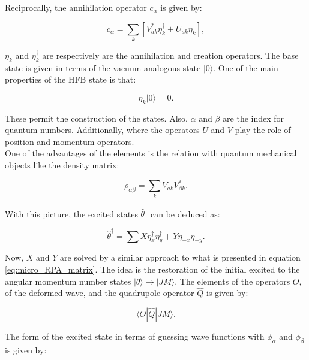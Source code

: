 \documentclass[openany]{book}
\begin{document}
Reciprocally, the annihilation operator $c_\alpha$ is given by: 


\begin{equation}\label{eq:micro_HFB_annihilation}
	c_\alpha = \sum_{k} [V^{*}_{ak} \eta^{\dagger}_k + U_{ak} \eta_k],
\end{equation}

$\eta_k$ and  $\eta^{\dagger}_k $ are respectively are the annihilation and creation operators.  The base state is given in terms of the vacuum analogous state $| 0 \rangle$. One of the main properties of the HFB state is that: 

\begin{equation}\label{eq:micro_HFB_base}
	\eta_k |0\rangle = 0.
\end{equation} 

These permit the construction of the states. Also, $\alpha$ and $\beta$ are the index for quantum numbers. Additionally, where the operators $U$ and $V$ play the role of position and momentum operators. \\

One of the advantages of the elements is the relation with quantum mechanical objects like the density matrix: 

\begin{equation}\label{eq:micro_HFB_densityMatrix}
	\rho_{\alpha \beta} = \sum_k {V_{ak}V^{*}_{\beta k}}.
\end{equation}

With this picture, the excited states ${\hat {\theta}}^{\dagger}$ can be deduced as:

\begin{equation}\label{eq:micro_QHFB_excited}
	{\hat {\theta}}^{\dagger} = \sum X \eta^\dagger_x \eta^\dagger_y   + Y \eta_{-x} \eta_{-y}.
\end{equation}

Now, $X$ and $Y$ are solved by a similar approach to what is presented in equation \ref{eq:micro_RPA_matrix}. The idea is the restoration of the initial excited to the angular momentum number states $|\theta \rangle \rightarrow | JM \rangle$. The elements of the operators $O$, of the deformed wave, and the quadrupole operator $\hat Q$ is given by: 

\begin{equation}\label{eq:micro_QHFB_quadrupole}
	\langle  O | \hat Q|  JM \rangle. 
\end{equation}

The form of the excited state in terms of guessing wave functions with $\phi_\alpha$ and $\phi_\beta$ is given by:
\end{document}
